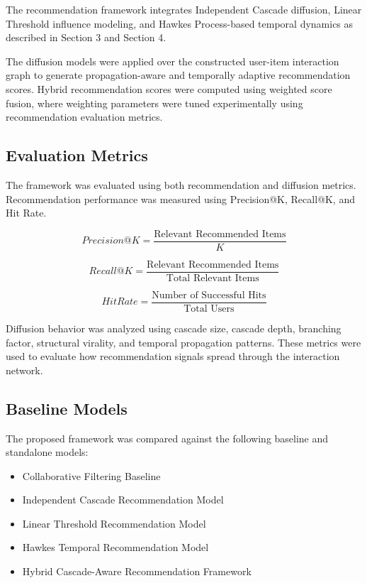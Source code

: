 \documentclass{article}
\begin{document}
The recommendation framework integrates Independent Cascade diffusion, Linear Threshold influence modeling, and Hawkes Process-based temporal dynamics as described in Section 3 and Section 4.

The diffusion models were applied over the constructed user-item interaction graph to generate propagation-aware and temporally adaptive recommendation scores. Hybrid recommendation scores were computed using weighted score fusion, where weighting parameters were tuned experimentally using recommendation evaluation metrics.

\subsection{Evaluation Metrics}

The framework was evaluated using both recommendation and diffusion metrics. Recommendation performance was measured using Precision@K, Recall@K, and Hit Rate.

\[
Precision@K = \frac{\text{Relevant Recommended Items}}{K}
\]

\[
Recall@K = \frac{\text{Relevant Recommended Items}}{\text{Total Relevant Items}}
\]

\[
HitRate = \frac{\text{Number of Successful Hits}}{\text{Total Users}}
\]

Diffusion behavior was analyzed using cascade size, cascade depth, branching factor, structural virality, and temporal propagation patterns. These metrics were used to evaluate how recommendation signals spread through the interaction network.

\subsection{Baseline Models}

The proposed framework was compared against the following baseline and standalone models:

\begin{itemize}
\item Collaborative Filtering Baseline
\item Independent Cascade Recommendation Model
\item Linear Threshold Recommendation Model
\item Hawkes Temporal Recommendation Model
\item Hybrid Cascade-Aware Recommendation Framework
\end{itemize}
\end{document}
